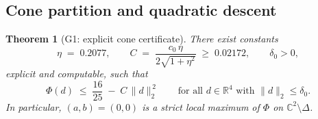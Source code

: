 \documentclass[11pt,a4paper]{article}
\newtheorem{theorem}{Theorem}[section]
\begin{document}
\subsection{Cone partition and quadratic descent}

\begin{theorem}[G1: explicit cone certificate]\label{thm:G1}
There exist constants
\begin{equation}
\eta \;=\; 0.2077,
\qquad
C \;=\; \frac{c_0\,\eta}{2\sqrt{1+\eta^2}}
\;\ge\; 0.02172,
\qquad
\delta_0 > 0,
\end{equation}
explicit and computable, such that
\begin{equation}
\Phi(d) \;\le\; \frac{16}{25} \;-\; C\,\|d\|_2^{\,2}
\qquad\text{for all $d\in\mathbb{R}^4$ with $\|d\|_2 \le \delta_0$.}
\end{equation}
In particular, $(a,b)=(0,0)$ is a strict local maximum of $\Phi$ on
$\mathbb{C}^2\setminus\Delta$.
\end{theorem}
\end{document}
